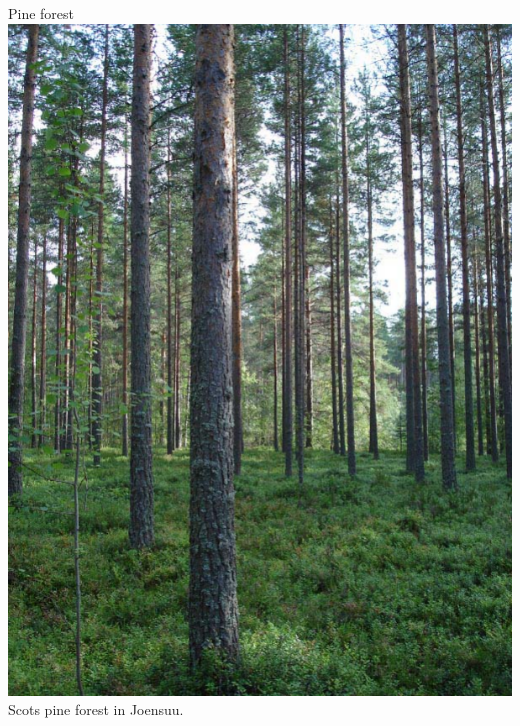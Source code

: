 \documentclass[10pt]{beamer}\usepackage[]{graphicx}\usepackage[]{color}
\begin{document}
\begin{frame}{Pine forest}
    \centering
    \includegraphics[height=0.65\textheight]{figures/PineForestJoensuu}\\
    {\small Scots pine forest in Joensuu.}
\end{frame}
\end{document}
